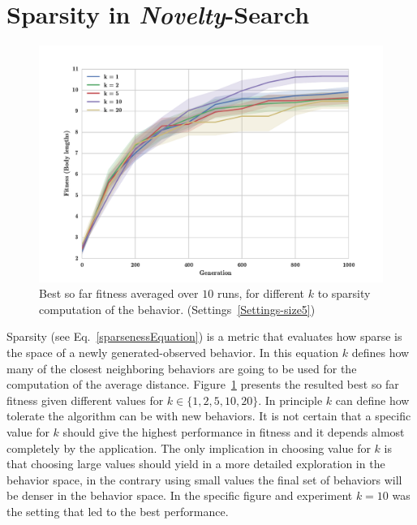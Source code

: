 \section{Sparsity in \emph{Novelty}-Search}


\begin{figure}[b!]
\centering
\includegraphics[width=1.0\textwidth]{../Figures/Results/KnnExperimentSize5.pdf}
\caption{Best so far fitness averaged over $10$ runs, for different $k$ to sparsity computation of the behavior. (Settings~\ref{Settings-size5})}
\label{fig:KnnExperimentSize5}
\end{figure}


Sparsity (see Eq.~\ref{sparsenessEquation}) is a metric that evaluates how sparse is the space of a newly generated-observed behavior. In this equation $k$ defines how many of the closest neighboring behaviors are going to be used for the computation of the average distance. Figure~\ref{fig:KnnExperimentSize5} presents the resulted best so far fitness given different values for $k \in \lbrace 1, 2, 5, 10, 20 \rbrace$. In principle $k$ can define how tolerate the algorithm can be with new behaviors. It is not certain that a specific value for $k$ should give the highest performance in fitness and it depends almost completely by the application. The only implication in choosing value for $k$ is that choosing large values should yield in a more detailed exploration in the behavior space, in the contrary using small values the final set of behaviors will be denser in the behavior space. In the specific figure and experiment $k=10$ was the setting that led to the best performance.







